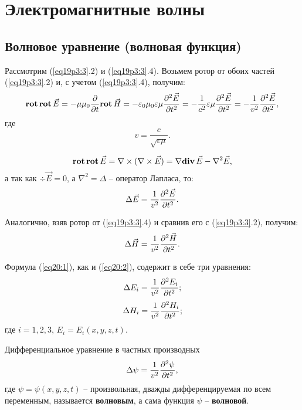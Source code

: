 \chapter{Электромагнитные волны}

\section{Волновое уравнение (волновая функция)}

	Рассмотрим (\ref{eq19p3:3}.2) и (\ref{eq19p3:3}.4). Возьмем ротор от обоих
    частей (\ref{eq19p3:3}.2) и, с учетом (\ref{eq19p3:3}.4), получим:
	\[
        \mathbf{rot\,}\mathbf{rot\,}\vec{E} = -\mu\mu_0\frac{\partial }{\partial t}\mathbf{rot\,}\vec{H} = 
        -\varepsilon_0\mu_0\varepsilon\mu\frac{\partial^2 \vec{E}}{\partial t^2} = 
        -\frac{1}{c^2}\varepsilon\mu\frac{\partial^2 \vec{E}}{\partial t^2} = 
        -\frac{1}{v^2}\frac{\partial^2 \vec{E}}{\partial t^2},
        \]
	где
    \[
        v = \frac{c}{\sqrt{\varepsilon\mu}}.
    \]
	
	\[
        \mathbf{rot\,}\mathbf{rot\,}\vec{E} = \nabla\times(\nabla\times\vec{E}) =
        \nabla\mathbf{div\,}\vec{E} - \nabla^2\vec{E},
    \]
	а так как \( \div\vec{E} = 0 \), а \( \nabla^2 = \Delta \) -- оператор
    Лапласа, то:
	\begin{equation}
		\Delta\vec{E} = \frac{1}{v^2}\frac{\partial^2 \vec{E}}{\partial t^2}.
        \label{eq20:1}
	\end{equation}
	
	Аналогично, взяв ротор от (\ref{eq19p3:3}.4) и сравнив его с 
    (\ref{eq19p3:3}.2), получим:
	\begin{equation}
		\Delta\vec{H} = \frac{1}{v^2}\frac{\partial^2 \vec{H}}{\partial t^2}.
        \label{eq20:2}
	\end{equation}
	
	Формула (\ref{eq20:1}), как и (\ref{eq20:2}), содержит в себе три уравнения:
	\[
        \Delta E_i = \frac{1}{v^2}\frac{\partial^2 E_i}{\partial t^2};
    \]
	\[
        \Delta H_i = \frac{1}{v^2}\frac{\partial^2 H_i}{\partial t^2};
    \]
	где \( i = 1, 2, 3 \), \( E_i = E_i(x, y, z, t) \).
	
	\begin{definition}
        Дифференциальное уравнение в частных производных
        \begin{equation}
            \Delta\psi = \frac{1}{v^2}\frac{\partial^2 \psi}{\partial t^2},
            \label{eq20:3}
        \end{equation}
        где \( \psi = \psi(x, y, z, t) \) -- произвольная, дважды
        дифференцируемая по всем переменным, называется \textbf{волновым}, а
        сама функция  \( \psi \) -- \textbf{волновой}.
	\end{definition}
	
